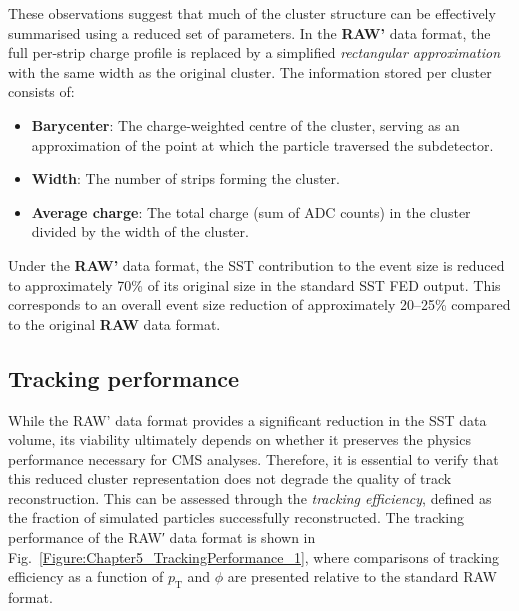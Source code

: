 These observations suggest that much of the cluster structure can be effectively summarised using a reduced set of parameters. In the \textbf{RAW'} data format, the full per-strip charge profile is replaced by a simplified \textit{rectangular approximation} with the same width as the original cluster. The information stored per cluster consists of:

\begin{itemize}
    \item \textbf{Barycenter}: The charge-weighted centre of the cluster, serving as an approximation of the point at which the particle traversed the subdetector.
    \item \textbf{Width}: The number of strips forming the cluster.
    \item \textbf{Average charge}: The total charge (sum of ADC counts) in the cluster divided by the width of the cluster.
\end{itemize}

Under the \textbf{RAW'} data format, the SST contribution to the event size is reduced to approximately 70\% of its original size in the standard SST FED output. This corresponds to an overall event size reduction of approximately 20–25\% compared to the original \textbf{RAW} data format.

\subsection{Tracking performance}

While the RAW' data format provides a significant reduction in the SST data volume, its viability ultimately depends on whether it preserves the physics performance necessary for CMS analyses. Therefore, it is essential to verify that this reduced cluster representation does not degrade the quality of track reconstruction. This can be assessed through the \textit{tracking efficiency}, defined as the fraction of simulated particles successfully reconstructed. The tracking performance of the RAW′ data format is shown in Fig.~\ref{Figure:Chapter5_TrackingPerformance_1}, where comparisons of tracking efficiency as a function of $p_\mathrm{T}$ and $\phi$ are presented relative to the standard RAW format.

